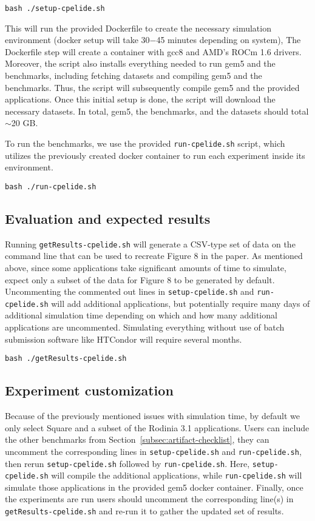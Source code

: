 \documentclass{sigplanconf}
\begin{document}
\noindent
\texttt{bash ./setup-cpelide.sh}

This will run the provided Dockerfile to create the necessary simulation environment (docker setup will take 30$-$45 minutes depending on system),
The Dockerfile step will create a container with gcc8 and AMD's ROCm 1.6 drivers.
Moreover, the script also installs everything needed to run gem5 and the benchmarks, including fetching datasets and compiling gem5 and the benchmarks.
Thus, the script will subsequently compile gem5 and the provided applications.
Once this initial setup is done, the script will download the necessary datasets.
In total, gem5, the benchmarks, and the datasets should total $\sim$20 GB.

To run the benchmarks, we use the provided \texttt{run-cpelide.sh} script, which utilizes the previously created docker container to run each experiment inside its environment.

\noindent
\texttt{bash ./run-cpelide.sh}

\subsection{Evaluation and expected results}
\label{subsec:artifact-res}


Running \texttt{getResults-cpelide.sh} will generate a CSV-type set of data on the command line that can be used to recreate Figure 8 in the paper.
As mentioned above, since some applications take significant amounts of time to simulate, expect only a subset of the data for Figure 8 to be generated by default.
Uncommenting the commented out lines in \texttt{setup-cpelide.sh} and \texttt{run-cpelide.sh} will add additional applications, but potentially require many days of additional simulation time depending on which and how many additional applications are uncommented.
Simulating everything without use of batch submission software like HTCondor will require several months.

\noindent
\texttt{bash ./getResults-cpelide.sh}

\subsection{Experiment customization}
\label{subsec:artifact-custom}

Because of the previously mentioned issues with simulation time, by default we only select Square and a subset of the Rodinia 3.1 applications.
Users can include the other benchmarks from Section~\ref{subsec:artifact-checklist}, they can uncomment the corresponding lines in \texttt{setup-cpelide.sh} and \texttt{run-cpelide.sh}, then rerun \texttt{setup-cpelide.sh} followed by \texttt{run-cpelide.sh}.
Here, \texttt{setup-cpelide.sh} will compile the additional applications, while \texttt{run-cpelide.sh} will simulate those applications in the provided gem5 docker container.
Finally, once the experiments are run users should uncomment the corresponding line(s) in \texttt{getResults-cpelide.sh} and re-run it to gather the updated set of results.
\end{document}

